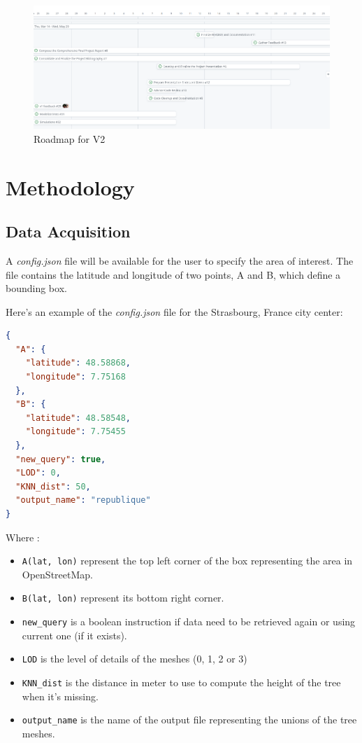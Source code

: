 \documentclass[12pt]{article}
\begin{document}
\begin{figure}[H]
    \centering
    \includegraphics[width=1\textwidth]{images/roadmap_v2.png}
    \caption{Roadmap for V2}
\end{figure}

\newpage

\section{Methodology}

\subsection{Data Acquisition}
A \textit{config.json} file will be available for the user to specify the area of
interest. The file contains the latitude and longitude of two points, A and B,
which define a bounding box.

Here's an example of the \textit{config.json} file for the Strasbourg, France
city center:

\begin{lstlisting}[language=json]
{
  "A": {
    "latitude": 48.58868,
    "longitude": 7.75168
  },
  "B": {
    "latitude": 48.58548,
    "longitude": 7.75455
  },
  "new_query": true,
  "LOD": 0,
  "KNN_dist": 50,
  "output_name": "republique"
}
\end{lstlisting}

Where :
\begin{itemize}
    \item \texttt{A(lat, lon)} represent the top left corner of the box representing the area in OpenStreetMap.
    \item \texttt{B(lat, lon)} represent its bottom right corner.
    \item \texttt{new\_query} is a boolean instruction if data need to be retrieved again or using current one (if it exists).
    \item \texttt{LOD} is the level of details of the meshes (0, 1, 2 or 3)
    \item \texttt{KNN\_dist} is the distance in meter to use to compute the height of the tree when it's missing.
    \item \texttt{output\_name} is the name of the output file representing the unions of the tree meshes.
\end{itemize}
\end{document}
